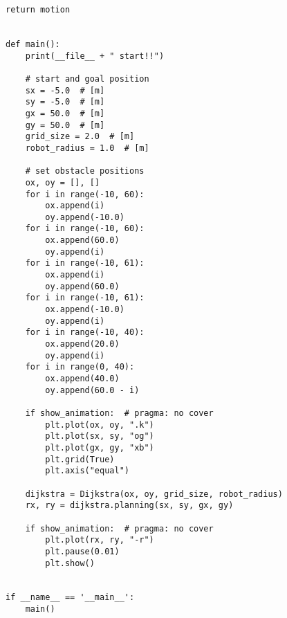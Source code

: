 \begin{lstlisting}[caption=Grid based Dijkstra planning (Atsushi's project)(\autoref{Pathfinding}), label=Atsushi]
        return motion


def main():
    print(__file__ + " start!!")

    # start and goal position
    sx = -5.0  # [m]
    sy = -5.0  # [m]
    gx = 50.0  # [m]
    gy = 50.0  # [m]
    grid_size = 2.0  # [m]
    robot_radius = 1.0  # [m]

    # set obstacle positions
    ox, oy = [], []
    for i in range(-10, 60):
        ox.append(i)
        oy.append(-10.0)
    for i in range(-10, 60):
        ox.append(60.0)
        oy.append(i)
    for i in range(-10, 61):
        ox.append(i)
        oy.append(60.0)
    for i in range(-10, 61):
        ox.append(-10.0)
        oy.append(i)
    for i in range(-10, 40):
        ox.append(20.0)
        oy.append(i)
    for i in range(0, 40):
        ox.append(40.0)
        oy.append(60.0 - i)

    if show_animation:  # pragma: no cover
        plt.plot(ox, oy, ".k")
        plt.plot(sx, sy, "og")
        plt.plot(gx, gy, "xb")
        plt.grid(True)
        plt.axis("equal")

    dijkstra = Dijkstra(ox, oy, grid_size, robot_radius)
    rx, ry = dijkstra.planning(sx, sy, gx, gy)

    if show_animation:  # pragma: no cover
        plt.plot(rx, ry, "-r")
        plt.pause(0.01)
        plt.show()


if __name__ == '__main__':
    main()
\end{lstlisting}
